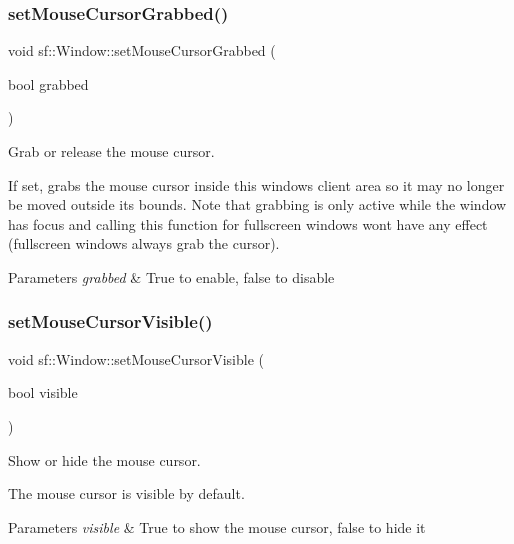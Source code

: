 \subsubsection{\texorpdfstring{set\+Mouse\+Cursor\+Grabbed()}{setMouseCursorGrabbed()}}
{\footnotesize\ttfamily void sf\+::\+Window\+::set\+Mouse\+Cursor\+Grabbed (\begin{DoxyParamCaption}\item[{bool}]{grabbed }\end{DoxyParamCaption})}



Grab or release the mouse cursor. 

If set, grabs the mouse cursor inside this window\textquotesingle{}s client area so it may no longer be moved outside its bounds. Note that grabbing is only active while the window has focus and calling this function for fullscreen windows won\textquotesingle{}t have any effect (fullscreen windows always grab the cursor).


\begin{DoxyParams}{Parameters}
{\em grabbed} & True to enable, false to disable \\
\hline
\end{DoxyParams}
\mbox{\label{classsf_1_1_window_aad3991c25e0a83afbb4d62febf9b7b14}} 
\subsubsection{\texorpdfstring{set\+Mouse\+Cursor\+Visible()}{setMouseCursorVisible()}}
{\footnotesize\ttfamily void sf\+::\+Window\+::set\+Mouse\+Cursor\+Visible (\begin{DoxyParamCaption}\item[{bool}]{visible }\end{DoxyParamCaption})}



Show or hide the mouse cursor. 

The mouse cursor is visible by default.


\begin{DoxyParams}{Parameters}
{\em visible} & True to show the mouse cursor, false to hide it \\
\hline
\end{DoxyParams}
\mbox{\label{classsf_1_1_window_a6c4078bfbf61c29bfc4b4732ce764f17}} 
